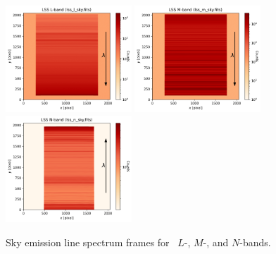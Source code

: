 \begin{figure}[!h]
\centering
  \includegraphics[height=4cm,keepaspectratio]{figures/LSS_CrtAlg_files/lss_l_sky.fits.png}
  \includegraphics[height=4cm,keepaspectratio]{figures/LSS_CrtAlg_files/lss_m_sky.fits.png}
  \includegraphics[height=4cm,keepaspectratio]{figures/LSS_CrtAlg_files/lss_n_sky.fits.png}
  \caption{Sky emission line spectrum frames for \lss~$L$-, $M$-, and $N$-bands.} 
  \label{fig:sky}
\end{figure}


